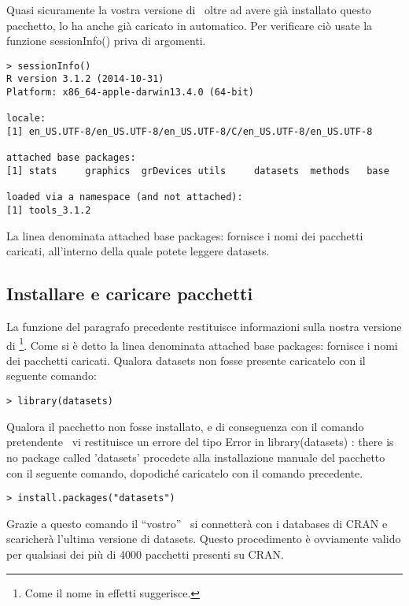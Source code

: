 Quasi sicuramente la vostra versione di \erre\ oltre ad avere già installato questo pacchetto, lo ha anche già caricato in automatico. Per verificare ciò usate la funzione \textsf{sessionInfo()} priva di argomenti.

\begin{lstlisting}
> sessionInfo()
R version 3.1.2 (2014-10-31)
Platform: x86_64-apple-darwin13.4.0 (64-bit)

locale:
[1] en_US.UTF-8/en_US.UTF-8/en_US.UTF-8/C/en_US.UTF-8/en_US.UTF-8

attached base packages:
[1] stats     graphics  grDevices utils     datasets  methods   base     

loaded via a namespace (and not attached):
[1] tools_3.1.2
\end{lstlisting}

La linea denominata \textsf{attached base packages:} fornisce i nomi dei pacchetti caricati, all'interno della quale potete leggere \textsf{datasets}.

\subsection{Installare e caricare pacchetti}
La funzione del paragrafo precedente restituisce informazioni sulla nostra versione di \erre\footnote{Come il nome in effetti suggerisce.}. Come si è detto la linea denominata \textsf{attached base packages:} fornisce i nomi dei pacchetti caricati. Qualora \textsf{datasets} non fosse presente caricatelo con il seguente comando:

\begin{lstlisting}
> library(datasets)
\end{lstlisting}

Qualora il pacchetto non fosse installato, e di conseguenza con il comando pretendente \erre\ vi restituisce un errore del tipo \textsf{Error in library(datasets) : there is no package called 'datasets'}  procedete alla installazione manuale del pacchetto con il seguente comando, dopodiché caricatelo con il comando precedente.

\begin{lstlisting}
> install.packages("datasets")
\end{lstlisting}

Grazie a questo comando il ``vostro'' \erre\ si connetterà con i databases di CRAN e scaricherà l'ultima versione di \textsf{datasets}. Questo procedimento è ovviamente valido per qualsiasi dei più di 4000 pacchetti presenti su CRAN.

